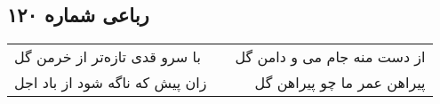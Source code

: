 \begin{center}
\section*{رباعی شماره ۱۲۰}
\label{sec:sh120}
\begin{longtable}{l p{0.5cm} r}
با سرو قدی تازه‌تر از خرمن گل
&&
از دست منه جام می و دامن گل
\\
زان پیش که ناگه شود از باد اجل
&&
پیراهن عمر ما چو پیراهن گل
\\
\end{longtable}
\end{center}
